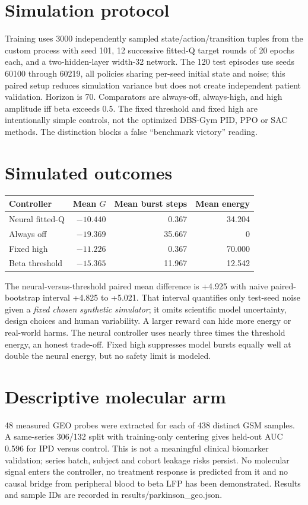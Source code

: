 \section{Simulation protocol}
Training uses 3000 independently sampled state/action/transition tuples from the custom process with seed 101, 12 successive fitted-Q target rounds of 20 epochs each, and a two-hidden-layer width-32 network. The 120 test episodes use seeds 60100 through 60219, all policies sharing per-seed initial state and noise; this paired setup reduces simulation variance but does not create independent patient validation. Horizon is 70. Comparators are always-off, always-high, and high amplitude iff beta exceeds 0.5. The fixed threshold and fixed high are intentionally simple controls, not the optimized DBS-Gym PID, PPO or SAC methods. The distinction blocks a false ``benchmark victory'' reading.
\section{Simulated outcomes}
\begin{center}\begin{tabular}{lrrr}\toprule Controller&Mean $G$&Mean burst steps&Mean energy\\\midrule Neural fitted-Q&$-10.440$&0.367&34.204\\Always off&$-19.369$&35.667&0\\Fixed high&$-11.226$&0.367&70.000\\Beta threshold&$-15.365$&11.967&12.542\\\bottomrule\end{tabular}\end{center}
The neural-versus-threshold paired mean difference is +4.925 with naive paired-bootstrap interval +4.825 to +5.021. That interval quantifies only test-seed noise given a \emph{fixed chosen synthetic simulator}; it omits scientific model uncertainty, design choices and human variability. A larger reward can hide more energy or real-world harms. The neural controller uses nearly three times the threshold energy, an honest trade-off. Fixed high suppresses model bursts equally well at double the neural energy, but no safety limit is modeled.
\section{Descriptive molecular arm}
48 measured GEO probes were extracted for each of 438 distinct GSM samples. A same-series 306/132 split with training-only centering gives held-out AUC 0.596 for IPD versus control. This is not a meaningful clinical biomarker validation; series batch, subject and cohort leakage risks persist. No molecular signal enters the controller, no treatment response is predicted from it and no causal bridge from peripheral blood to beta LFP has been demonstrated. Results and sample IDs are recorded in results/parkinson\_geo.json.
